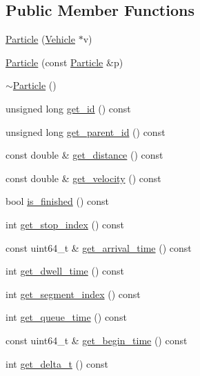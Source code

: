 \subsection*{Public Member Functions}
\begin{DoxyCompactItemize}
\item 
\hyperlink{classgtfs_1_1Particle_ad7f42e77c6c7f3042c977fd5a42ff82f}{Particle} (\hyperlink{classgtfs_1_1Vehicle}{Vehicle} $\ast$v)
\item 
\hyperlink{classgtfs_1_1Particle_ac386e64b43b1e317063f9a6666d604ce}{Particle} (const \hyperlink{classgtfs_1_1Particle}{Particle} \&p)
\item 
\hyperlink{classgtfs_1_1Particle_a3accf3496ad8460b4ad8b3f6da2de411}{$\sim$\+Particle} ()
\item 
unsigned long \hyperlink{classgtfs_1_1Particle_aff52b6b5e4c8f845f8ab3eefe766c365}{get\+\_\+id} () const 
\item 
unsigned long \hyperlink{classgtfs_1_1Particle_a4f103db764459e99f6427f8a4ca50b1f}{get\+\_\+parent\+\_\+id} () const 
\item 
const double \& \hyperlink{classgtfs_1_1Particle_a5a40610d1817be11b78dd174a0b95579}{get\+\_\+distance} () const 
\item 
const double \& \hyperlink{classgtfs_1_1Particle_a59be78fc85871f2a96defbe968f38b0d}{get\+\_\+velocity} () const 
\item 
bool \hyperlink{classgtfs_1_1Particle_a333f1a64280cb80c483669966007010b}{is\+\_\+finished} () const 
\item 
int \hyperlink{classgtfs_1_1Particle_a958ca8e84ea0ecb6ce20c6975d4c4532}{get\+\_\+stop\+\_\+index} () const 
\item 
const uint64\+\_\+t \& \hyperlink{classgtfs_1_1Particle_a7c312cde31f493412d1ba2e64f26d0a5}{get\+\_\+arrival\+\_\+time} () const 
\item 
int \hyperlink{classgtfs_1_1Particle_aafaaf9b1754ff4d2e9e92107210e84f6}{get\+\_\+dwell\+\_\+time} () const 
\item 
int \hyperlink{classgtfs_1_1Particle_aeac83db9e5f1704685c687110ee18e15}{get\+\_\+segment\+\_\+index} () const 
\item 
int \hyperlink{classgtfs_1_1Particle_a2233a6cc7001bd00aea13aea5a2ae820}{get\+\_\+queue\+\_\+time} () const 
\item 
const uint64\+\_\+t \& \hyperlink{classgtfs_1_1Particle_a3407a1d365a956fbc73897cf31341532}{get\+\_\+begin\+\_\+time} () const 
\item 
int \hyperlink{classgtfs_1_1Particle_adb52a2baff15c6dbfe955ea1cd16a41d}{get\+\_\+delta\+\_\+t} () const 

\end{DoxyCompactItemize}
